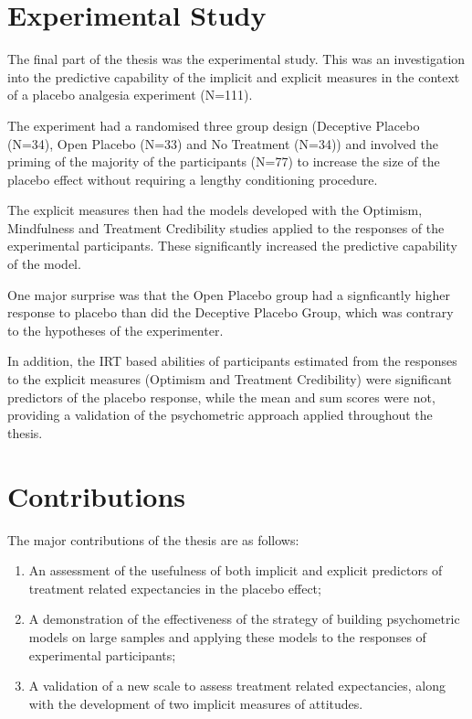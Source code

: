 \documentclass{article}
\begin{document}
\section{Experimental Study}
\label{sec:experimental-study}

The final part of the thesis was the experimental study. This was an investigation into the predictive capability of the implicit and explicit measures in the context of a placebo analgesia experiment (N=111). 

The experiment had a randomised three group design (Deceptive Placebo (N=34), Open Placebo (N=33) and No Treatment (N=34)) and involved the priming of the majority of the participants (N=77) to increase the size of the placebo effect without requiring a lengthy conditioning procedure. 

The explicit measures then had the models developed with the Optimism, Mindfulness and Treatment Credibility studies applied to the responses of the experimental participants. These significantly increased the predictive capability of the model.



One major surprise was that the Open Placebo group had a signficantly higher response to placebo than did the Deceptive Placebo Group, which was contrary to the hypotheses of the experimenter. 

In addition, the IRT based abilities of participants estimated from the responses to the explicit measures (Optimism and Treatment Credibility) were significant predictors of the placebo response, while the mean and sum scores were not, providing a validation of the psychometric approach applied throughout the thesis. 

\section{Contributions}
\label{sec:contributions}



The major contributions of the thesis are as follows:

\begin{enumerate}
\item An assessment of the usefulness of both implicit and explicit predictors of treatment related expectancies in the placebo effect;

\item A demonstration of the effectiveness of the strategy of building psychometric models on large samples and applying these models to the responses of experimental participants;


\item A validation of a new scale to assess treatment related expectancies, along with the development of two implicit measures of attitudes. 

\end{enumerate}



 
\end{document}
